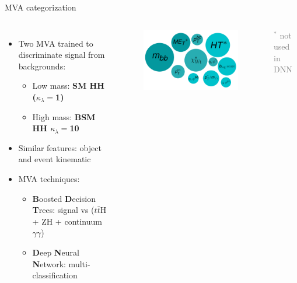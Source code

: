 \begin{frame}{MVA categorization}

\begin{columns}
\begin{itemize}
    \item Two MVA trained to discriminate signal from backgrounds:
    \begin{itemize}
        \item Low mass: \textbf{\textcolor{HHred}{SM HH ($\kappa_{\lambda} = $1)}}
        \item High mass: \textbf{\textcolor{HHturquoise_d}{BSM HH $\kappa_{\lambda} = $10}}
    \end{itemize}
    \item Similar features: object and event kinematic
    \item MVA techniques: 
    \begin{itemize}
        \item \textcolor{structurColor}{\textbf{B}oosted \textbf{D}ecision \textbf{T}rees}: signal vs ($t\bar{t}$H + ZH + continuum $\gamma\gamma$)
        \item \textbf{D}eep \textbf{N}eural \textbf{N}etwork: multi-classification
    \end{itemize}
\end{itemize}  


\begin{figure}
    \centering
    \includegraphics[width=1.\textwidth]{Part3/Img/MV_var.png}
\end{figure}
\textcolor{gray}{$^{*}$ not used in DNN} \\


\end{columns}   
\end{frame}


